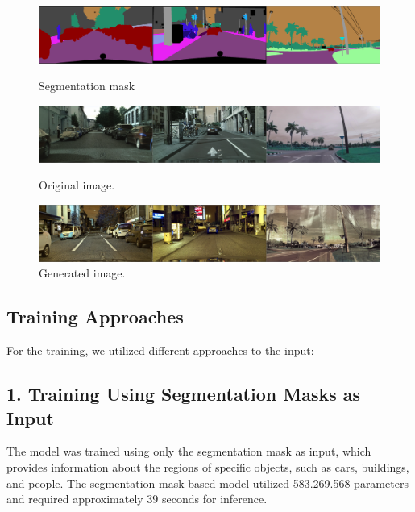 \documentclass[12pt,a4paper]{report}
\begin{document}
\begin{figure}[h]
    \centering
    \begin{minipage}{1\textwidth}
        \centering
        \includegraphics[width=\textwidth]{control_gs-003500_e-000001_b-001500.png}
        \caption{Segmentation mask}
        \label{fig:image1}
    \end{minipage}
    \hfill
    \begin{minipage}{1\textwidth}
        \centering
        \includegraphics[width=\textwidth]{reconstruction_gs-003500_e-000001_b-001500.png}
        \caption{Original image.}
        \label{fig:image2}
    \end{minipage}
        \begin{minipage}{1\textwidth}
        \centering
        \includegraphics[width=\textwidth]{samples_cfg_scale_9.00_gs-003500_e-000001_b-001500.png}
        \caption{Generated image.}
        \label{fig:image2}
    \end{minipage}
\end{figure}


\subsection*{ Training Approaches}

For the training, we utilized different approaches to the input:

\subsection*{1. Training Using Segmentation Masks as Input}
The model was trained using only the segmentation mask as input, which provides information about the regions of specific objects, such as cars, buildings, and people. The segmentation mask-based model utilized 583.269.568 parameters and required approximately 39 seconds for inference.
\end{document}
